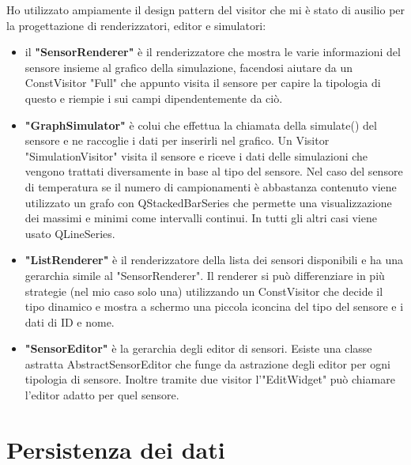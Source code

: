 \documentclass{article}
\begin{document}
Ho utilizzato ampiamente il design pattern del visitor che mi è stato di ausilio per la progettazione di renderizzatori, editor e simulatori:
\begin{itemize}
    \item il \textbf{"SensorRenderer"} è il renderizzatore che mostra le varie informazioni del sensore insieme al grafico della simulazione, facendosi aiutare da un ConstVisitor "Full" che appunto visita il sensore per capire la tipologia di questo e riempie i sui campi dipendentemente da ciò.
    \item \textbf{"GraphSimulator"} è colui che effettua la chiamata della simulate() del sensore e ne raccoglie i dati per inserirli nel grafico. Un Visitor "SimulationVisitor" visita il sensore e riceve i dati delle simulazioni che vengono trattati diversamente in base al tipo del sensore. Nel caso del sensore di temperatura se il numero di campionamenti è abbastanza contenuto viene utilizzato un grafo con QStackedBarSeries che permette una visualizzazione dei massimi e minimi come intervalli continui. In tutti gli altri casi viene usato QLineSeries.
    \item \textbf{"ListRenderer"} è il renderizzatore della lista dei sensori disponibili e ha una gerarchia simile al "SensorRenderer". Il renderer si può differenziare in più strategie (nel mio caso solo una) utilizzando un ConstVisitor che decide il tipo dinamico e mostra a schermo una piccola iconcina del tipo del sensore e i dati di ID e nome.
    \item \textbf{"SensorEditor"} è la gerarchia degli editor di sensori. Esiste una classe astratta AbstractSensorEditor che funge da astrazione degli editor per ogni tipologia di sensore. Inoltre tramite due visitor l'"EditWidget" può chiamare l'editor adatto per quel sensore.
\end{itemize}

\section{Persistenza dei dati}
\end{document}
